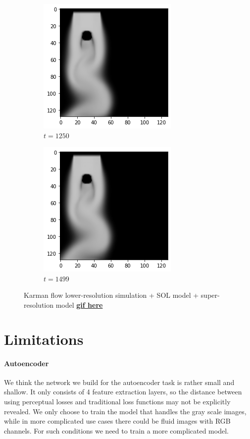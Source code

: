 \documentclass[a4paper,12pt,twoside]{report}
\begin{document}
\begin{figure}
\begin{subfigure}{0.18\textwidth}
	\end{subfigure}
	\begin{subfigure}{0.18\textwidth}
		\centering
		\includegraphics[scale=0.3]{timecost/low1250.png}
		\caption{$t=1250$}
	\end{subfigure}
	\begin{subfigure}{0.18\textwidth}
		\centering
		\includegraphics[scale=0.3]{timecost/low1499.png}
		\caption{$t=1499$}
	\end{subfigure}
	\caption{Karman flow lower-resolution simulation + SOL model + super-resolution model \href{https://github.com/w191444052/sol-data/blob/master/sol\%2Bsuperresolution/sol\%2Bsuperresolution_output.gif}{\textbf{gif here}}}
	\label{timecost out}
\end{figure}

\section{Limitations}
\paragraph{Autoencoder} We think the network we build for the autoencoder task is rather small and shallow. It only consists of 4 feature extraction layers, so the distance between using perceptual losses and traditional loss functions may not be explicitly revealed. We only choose to train the model that handles the gray scale images, while in more complicated use cases there could be fluid images with RGB channels. For such conditions we need to train a more complicated model.
\end{document}
